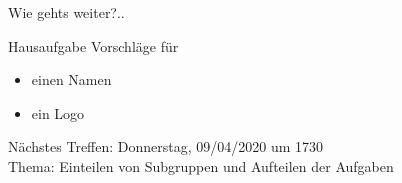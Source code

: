 \documentclass{beamer}
\begin{document}
\begin{frame}{Wie gehts weiter?..}

\begin{alertblock}{Hausaufgabe}
Vorschl\"age f\"ur
\begin{itemize}
 \item einen Namen
 \item ein Logo
\end{itemize}
\end{alertblock}

\begin{alertblock}{N\"achstes Treffen:}
Donnerstag, 09/04/2020 um 1730\\
Thema: Einteilen von Subgruppen und Aufteilen der Aufgaben
\end{alertblock}

\end{frame}
\end{document}
